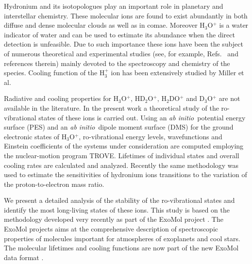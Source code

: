 \documentclass[prb,preprint,12pt,superscriptaddress,floatfix,bibnotes,nofootinbib,unsortedaddress,preprintnumbers,amsmath,amssymb]{revtex4}
\newcommand{\ai}{\textit{ab initio}}
\newcommand{\2}{$_{2}$}
\newcommand{\3}{$_{3}$}
\begin{document}
Hydronium and its isotopologues play an important role in planetary and
interstellar chemistry.\cite{00JeBiSa.H3O+,01GoCexx.H3O+} These molecular ions
are found to exist abundantly in both diffuse and dense molecular clouds as well
as in comae. Moreover H$_3$O$^{+}$ is a water indicator of water and can be used to
estimate its abundance when the direct detection is
unfeasible.\cite{92PhVaKe.H3O+} Due to such importance these ions have been the
subject of numerous theoretical and experimental studies (see, for example,
Refs.~%
 and references therein) mainly devoted to the
spectroscopy and chemistry of the species. Cooling function of the H$_3^{+}$ ion
has been extensively studied by Miller et al.\cite{jt181,10MiStMe.H3+,13MiStTe.H3+}

Radiative and cooling properties for H$_3$O$^{+}$, HD$_2$O$^{+}$, H$_2$DO$^{+}$
and D$_3$O$^{+}$ are not available in the literature. In the present
work a theoretical study of the ro-vibrational states of these ions is carried
out.  Using  an \ai\  potential energy surface (PES) and an \ai\ dipole moment surface
(DMS) \cite{15OwYuPo.H3O+} for the ground electronic states of H$_3$O$^{+}$,
ro-vibrational energy levels, wavefunctions and Einstein coefficients of the
systems under consideration are computed  employing the nuclear-motion program TROVE.\cite{TROVE,15YaYuxx.method}
Lifetimes of individual states and overall cooling rates are calculated and analyzed.
Recently the same methodology was used to estimate the sensitivities of
hydronium ions  transitions to the variation of the proton-to-electron mass
ratio.\cite{15OwYuPo.H3O+}

We present a detailed analysis of the stability of the ro-vibrational states and
identify the most long-living states of these ions. This study is based on the
methodology \cite{16TeHuNa.method} developed very recently as part of the ExoMol
project \cite{12TeYuxx.db}. The ExoMol projects aims at the comprehensive
description of spectroscopic properties of molecules important for atmospheres
of exoplanets and cool stars. The molecular lifetimes and cooling functions are
now part of the new ExoMol data format \cite{16TeYuAl.db}.
\end{document}
